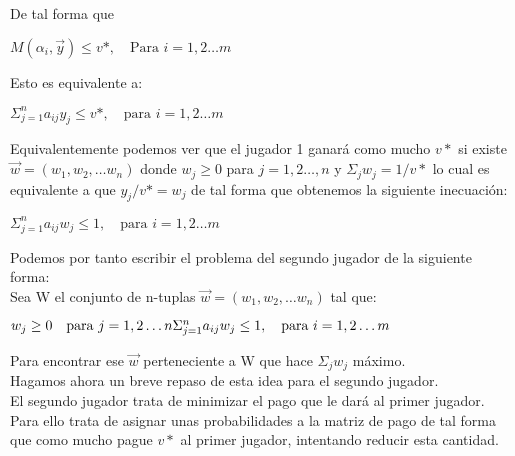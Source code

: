 \documentclass[10pt,a4paper]{book}
\begin{document}
De tal forma que 
\begin{center}

$M(\alpha_i,\vec{y}) \leq v*, \quad \mbox{Para } i=1,2 \ldots m$

\end{center}

Esto es equivalente a: 

\begin{center}

$\Sigma^n_{j=1} a_{ij}y_j \leq v*, \quad \mbox{para } i=1,2 \ldots m$

\end{center}

Equivalentemente podemos ver que el jugador 1 ganará como mucho $v*$ si existe $\vec{w}=(w_1,w_2,\ldots w_n)$ donde $w_j \geq 0 $ para $j=1,2 \ldots ,n $ y $\Sigma_j w_j = 1/v*$ lo cual es equivalente a que $y_j/v*=w_j$ de tal forma que obtenemos la siguiente inecuación:\\

\begin{center}

$\Sigma^n_{j=1} a_{ij}w_j \leq 1, \quad \mbox{para } i=1,2 \ldots m$

\end{center}

Podemos por tanto escribir el problema del segundo jugador de la siguiente forma:\\

Sea W el conjunto de n-tuplas $\vec{w}=(w_1,w_2,\ldots w_n)$ tal que:\\

\begin{center}

$w_j \geq 0 \quad \mbox{para } j=1,2 \ldots n \newline 
\Sigma^n_{j=1} a_{ij}w_j \leq 1, \quad \mbox{para } i=1,2 \ldots m$


\end{center}

Para encontrar ese $\vec{w}$ perteneciente a W que hace $\Sigma_j w_j$ máximo.\\

Hagamos ahora un breve repaso de esta idea para el segundo jugador.\\
El segundo jugador trata de minimizar el pago que le dará al primer jugador. \\
Para ello trata de asignar unas probabilidades a la matriz de pago de tal forma que como mucho pague $v*$ al primer jugador, intentando reducir esta cantidad.\\
\end{document}
